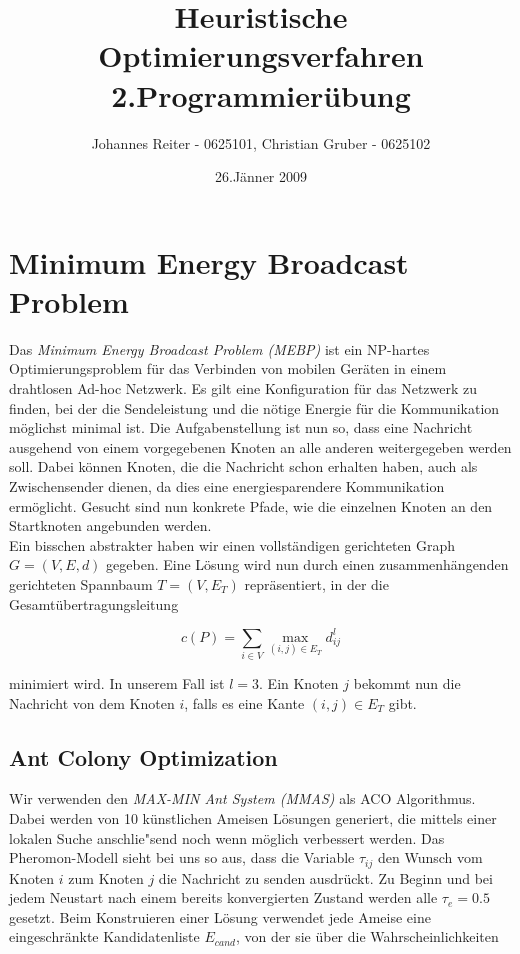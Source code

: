 \documentclass[a4paper,10pt]{article}
\title{Heuristische Optimierungsverfahren \\ \bigskip \textbf{2.Programmier\"{u}bung}}
\author{Johannes Reiter - 0625101, Christian Gruber - 0625102}
\date{26.J\"{a}nner 2009}
\begin{document}
\maketitle

\section{Minimum Energy Broadcast Problem}
Das \textit{Minimum Energy Broadcast Problem (MEBP)} ist ein NP-hartes Optimierungsproblem f\"{u}r das Verbinden von mobilen Ger\"{a}ten in einem drahtlosen Ad-hoc Netzwerk. Es gilt eine Konfiguration f\"{u}r das Netzwerk zu finden, bei der die Sendeleistung und die n\"{o}tige Energie f\"{u}r die Kommunikation m\"{o}glichst minimal ist. Die Aufgabenstellung ist nun so, dass eine Nachricht ausgehend von einem vorgegebenen Knoten an alle anderen weitergegeben werden soll. Dabei k\"{o}nnen Knoten, die die Nachricht schon erhalten haben, auch als Zwischensender dienen, da dies eine energiesparendere Kommunikation erm\"{o}glicht. Gesucht sind nun konkrete Pfade, wie die einzelnen Knoten an den Startknoten angebunden werden.\\
Ein bisschen abstrakter haben wir einen vollst\"{a}ndigen gerichteten Graph $G = (V,E,d)$ gegeben. Eine L\"{o}sung wird nun durch einen zusammenh\"{a}ngenden gerichteten Spannbaum $T = (V,E_{T})$ repr\"{a}sentiert, in der die Gesamt\"{u}bertragungsleitung

\begin{displaymath} 
c(P) = \sum_{i \in V} \max_{(i,j) \in E_T} d_{ij}^l
\end{displaymath}

minimiert wird. In unserem Fall ist $l=3$. Ein Knoten $j$ bekommt nun die Nachricht von dem Knoten $i$, falls es eine Kante $(i,j) \in E_T$ gibt.

\subsection{Ant Colony Optimization}
Wir verwenden den \textit{MAX-MIN Ant System (MMAS)} als ACO Algorithmus. Dabei werden von 10 k\"{u}nstlichen Ameisen L\"{o}sungen generiert, die mittels einer lokalen Suche anschlie"send noch wenn m\"{o}glich verbessert werden. Das Pheromon-Modell sieht bei uns so aus, dass die Variable $\tau_{ij}$ den Wunsch vom Knoten $i$ zum Knoten $j$ die Nachricht zu senden ausdr\"{u}ckt. Zu Beginn und bei jedem Neustart nach einem bereits konvergierten Zustand werden alle $\tau_e = 0.5$ gesetzt. Beim Konstruieren einer L\"{o}sung verwendet jede Ameise eine eingeschr\"{a}nkte Kandidatenliste $E_{cand}$, von der sie \"{u}ber die Wahrscheinlichkeiten
\end{document}
